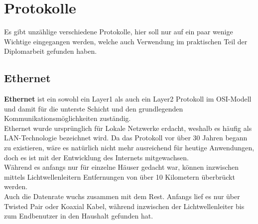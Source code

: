 \documentclass[12pt,a4paper]{report}
\begin{document}
\section{Protokolle}
Es gibt unzählige verschiedene Protokolle, hier soll nur auf ein paar wenige Wichtige eingegangen werden, welche auch Verwendung im praktischen Teil der Diplomarbeit gefunden haben.
\subsection{Ethernet}\label{ssec:eth}
\textbf{Ethernet} ist ein sowohl ein Layer1 als auch ein Layer2 Protokoll im OSI-Modell und damit für die unterste Schicht und den grundlegenden Kommunikationsmöglichkeiten zuständig.\\

Ethernet wurde ursprünglich für Lokale Netzwerke erdacht, weshalb es häufig als LAN-Technologie bezeichnet wird. Da das Protokoll vor über 30 Jahren begann zu existieren, wäre es natürlich nicht mehr ausreichend für heutige Anwendungen, doch es ist mit der Entwicklung des Internets mitgewachsen.\\
Während es anfangs nur für einzelne Häuser gedacht war, können inzwischen mittels Lichtwellenleitern Entfernungen von über 10 Kilometern überbrückt werden.\\

Auch die Datenrate wuchs zusammen mit dem Rest. Anfangs lief es nur über Twisted Pair oder Koaxial Kabel, während inzwischen der Lichtwellenleiter bis zum Endbenutzer in den Haushalt gefunden hat.\\
\end{document}
